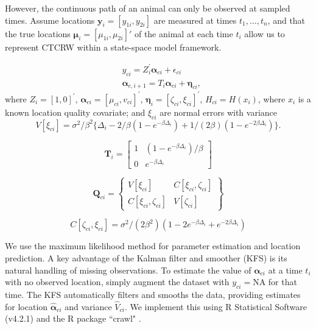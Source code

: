 \documentclass[11pt]{article}
\begin{document}
However, the continuous path of an animal can only be observed at sampled times. Assume locations $\bm{y}_i = [y_{1i}, y_{2i}]$ are measured at times $t_1, \ldots, t_n$, and that the true locations $\bm{\mu}_i = [\mu_{1i}, \mu_{2i}]'$ of the animal at each time $t_i$ allow us to represent CTCRW within a state-space model framework. 

\begin{align}\label{eq: general ssm}
	&y_{ci}=Z_i^{\prime}\bm{\alpha}_{ci}+\epsilon_{ci}\\
	&\bm{\alpha}_{c,i+1}=T_i\bm{\alpha}_{ci}+\bm{\eta}_{ci},
\end{align}
where $Z_i=[1, 0]^{\prime}$, $\bm{\alpha}_{ci}=[\mu_{ci}, v_{ci}]^{\prime}$, $\bm{\eta}_i=[\zeta_{ci}, \xi_{ci}]^{\prime}$, $H_{ci}=H(x_i)$, where $x_i$ is a known location quality covariate; and $\xi_{ci}$ are normal errors with variance 
\begin{equation}
	V[\xi_{ci}]=\sigma^2/\beta^2\{\Delta_i-2/\beta (1-e^{-\beta \Delta_i})+1/(2\beta)(1-e^{-2\beta\Delta_i})\}.
\end{equation}


\begin{equation}
	\mathbf{T}_i=\left[\begin{array}{cc}
1 & \left(1-e^{-\beta \Delta_i}\right) / \beta \\
0 & e^{-\beta \Delta_i}
\end{array}\right]
\end{equation}

\begin{equation}
	\mathbf{Q}_{c i}=\left\{\begin{array}{cc}
V\left[\xi_{c i}\right] & C\left[\xi_{c i}, \zeta_{c i}\right] \\
C\left[\xi_{c i}, \zeta_{c i}\right] & V\left[\zeta_{c i}\right]
\end{array}\right\}
\end{equation}

\begin{equation}
	C[\zeta_{ci}, \xi_{ci}]=\sigma^2/(2\beta^2)(1-2e^{-\beta\Delta_i}+e^{-2\beta\Delta_i})
\end{equation}


We use the maximum likelihood method for parameter estimation and location prediction. A key advantage of the Kalman filter and smoother (KFS) is its natural handling of missing observations. To estimate the value of $\bm{\alpha}_{ci}$ at a time $t_i$ with no observed location, simply augment the dataset with $y_{ci}=\mathrm{NA}$ for that time. The KFS automatically filters and smooths the data, providing estimates for location $\hat{\bm{\alpha}}_{ci}$ and variance $\hat{V}_{ci}$. We implement this using R Statistical Software (v4.2.1) \citep{R} and the R package ``crawl" \citep{johnson2018crawl}.
\end{document}
